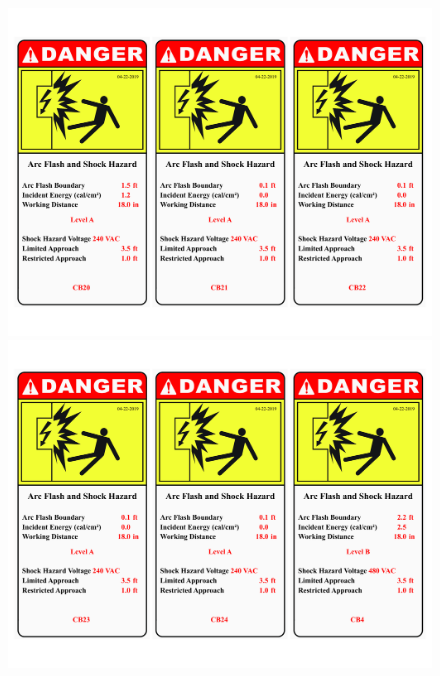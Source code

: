 \begin{figure}
\begin{minipage}[b]{0.5\linewidth}
	\centering
	\includegraphics[width=\textwidth]{figures/R1P_systemdesign/fig_ch04_elecaudit_arflashlable05}
\end{minipage}
\hspace{0.03cm}
\begin{minipage}[b]{0.5\linewidth}
	\centering
	\includegraphics[width=\textwidth]{figures/R1P_systemdesign/fig_ch04_elecaudit_arflashlable06}
\end{minipage}
\hspace{0.03cm}
\begin{minipage}[b]{0.5\linewidth}
	\centering

\end{minipage}
\end{figure}
